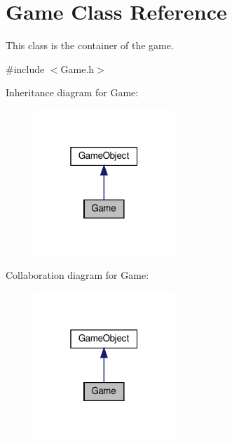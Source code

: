 \hypertarget{classGame}{}\section{Game Class Reference}
\label{classGame}


This class is the container of the game.  




{\ttfamily \#include $<$Game.\+h$>$}



Inheritance diagram for Game\+:
\nopagebreak
\begin{figure}[H]
\begin{center}
\leavevmode
\includegraphics[width=151pt]{classGame__inherit__graph}
\end{center}
\end{figure}


Collaboration diagram for Game\+:
\nopagebreak
\begin{figure}[H]
\begin{center}
\leavevmode
\includegraphics[width=151pt]{classGame__coll__graph}
\end{center}
\end{figure}
